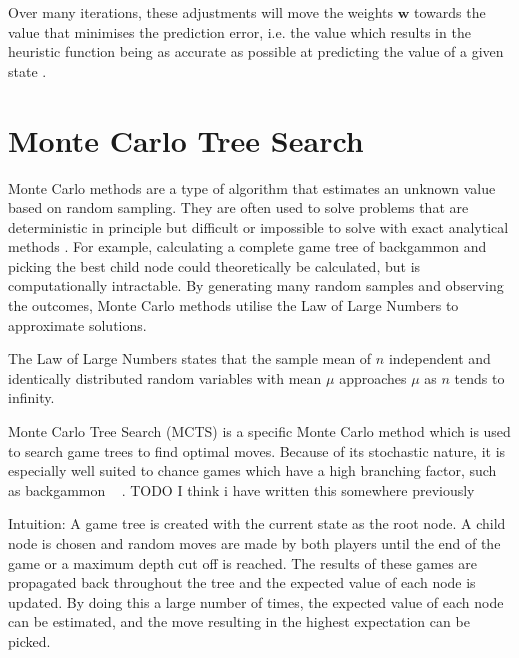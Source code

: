 Over many iterations, these adjustments will move the weights $\textbf{w}$ towards the value that minimises the prediction error, i.e. the value which results in the heuristic function being as accurate as possible at predicting the value of a given state \cite{sgd}.


\section{Monte Carlo Tree Search}
\label{sec:mcts}
Monte Carlo methods are a type of algorithm that estimates an unknown value based on random sampling. They are often used to solve problems that are deterministic in principle but difficult or impossible to solve with exact analytical methods \cite{RussellNorvig}. For example, calculating a complete game tree of backgammon and picking the best child node could theoretically be calculated, but is computationally intractable. By generating many random samples and observing the outcomes, Monte Carlo methods utilise the Law of Large Numbers to approximate solutions.

\begin{definition}
    The Law of Large Numbers states that the sample mean of $n$ independent and identically distributed random variables with mean $\mu$ approaches $\mu$ as $n$ tends to infinity.
\end{definition}


Monte Carlo Tree Search (MCTS) is a specific Monte Carlo method which is used to search game trees to find optimal moves. Because of its stochastic nature, it is especially well suited to chance games which have a high branching factor, such as backgammon ~\cite{Browne2012} \cite{mctsbranching}. TODO I think i have written this somewhere previously


Intuition: A game tree is created with the current state as the root node. A child node is chosen and random moves are made by both players until the end of the game or a maximum depth cut off is reached. The results of these games are propagated back throughout the tree and the expected value of each node is updated. By doing this a large number of times, the expected value of each node can be estimated, and the move resulting in the highest expectation can be picked.

